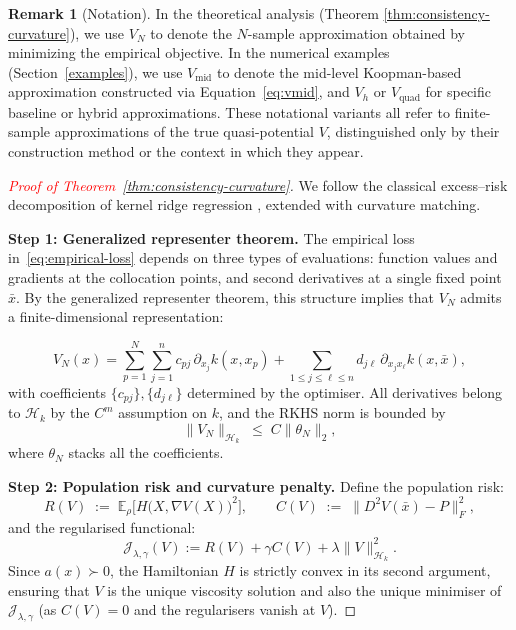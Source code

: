 \documentclass[11pt]{article}
\theoremstyle{plain}      %
\theoremstyle{definition} %
\newtheorem{remark}[theorem]{Remark}
\begin{document}
\begin{remark}[Notation]
In the theoretical analysis (Theorem \ref{thm:consistency-curvature}), we use $V_N$ to denote the $N$-sample approximation obtained by minimizing the empirical objective. In the numerical examples (Section~\ref{examples}), we use $V_{\text{mid}}$ to denote the mid-level Koopman-based approximation constructed via Equation~\eqref{eq:vmid}, and $V_h$ or $V_{\text{quad}}$ for specific baseline or hybrid approximations. These notational variants all refer to finite-sample approximations of the true quasi-potential $V$, distinguished only by their construction method or the context in which they appear.
\end{remark}

\begin{proof}[\textcolor{red}{Proof of Theorem~\ref{thm:consistency-curvature}}]
We follow the classical excess–risk decomposition of kernel ridge regression \cite{CaponnettoDeVito2007,SteinwartChristmann2008}, extended with curvature matching.

\medskip
\noindent\textbf{Step 1: Generalized representer theorem.}
The empirical loss in~\eqref{eq:empirical-loss} depends on three types of evaluations:
function values and gradients at the collocation points, and second derivatives at a single fixed point $\bar x$.
By the generalized representer theorem, this structure implies that $V_N$ admits a finite-dimensional representation:

\[
  V_{N}(x)
  = \sum_{p=1}^{N}\!\sum_{j=1}^{n}
        c_{pj}\,\partial_{x_{j}}k(x,x_{p})
    + \sum_{1\le j\le\ell\le n}
        d_{j\ell}\,\partial_{x_{j}x_{\ell}}k(x,\bar x),
\]
with coefficients $\{c_{pj}\},\{d_{j\ell}\}$ determined by the optimiser. All derivatives belong to $\mathcal H_{k}$ by the $C^m$ assumption on $k$, and the RKHS norm is bounded by
\[
  \|V_{N}\|_{\mathcal H_{k}}
  \;\le\;
  C\|\theta_{N}\|_2,
\]
where $\theta_{N}$ stacks all the coefficients.

\medskip
\noindent\textbf{Step 2: Population risk and curvature penalty.}
Define the population risk:
\[
  R(V)\;:=\;\mathbb{E}_{\rho}\!\bigl[H\!\bigl(X,\nabla V(X)\bigr)^{2}\bigr],
  \qquad
  C(V)\;:=\;\bigl\|D^{2}V(\bar x)-P\bigr\|^{2}_{F},
\]
and the regularised functional:
\[
  \mathcal J_{\lambda,\gamma}(V) := R(V)+\gamma C(V)+\lambda\|V\|_{\mathcal H_{k}}^{2}.
\]
Since $a(x)\succ 0$, the Hamiltonian $H$ is strictly convex in its second argument, ensuring that $V$ is the unique viscosity solution and also the unique minimiser of $\mathcal J_{\lambda,\gamma}$ (as $C(V)=0$ and the regularisers vanish at $V$).


\end{proof}
\end{document}
